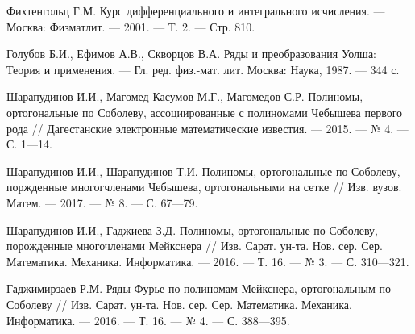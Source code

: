 \begin{thebibliography}{111}
Фихтенгольц Г.М.
Курс дифференциального и интегрального исчисления. --- Москва: Физматлит. --- 2001. --- Т. 2. --- Стр. 810.









Голубов Б.И., Ефимов А.В., Скворцов В.А. Ряды и преобразования Уолша: Теория и применения. --- Гл. ред. физ.-мат. лит. Москва: Наука, 1987. --- 344 с.








Шарапудинов И.И., Магомед-Касумов М.Г., Магомедов С.Р. Полиномы, ортогональные по Соболеву, ассоциированные с полиномами Чебышева первого рода // Дагестанские электронные математические известия. --- 2015. --- № 4. --- С. 1---14.








Шарапудинов И.И., Шарапудинов Т.И. Полиномы, ортогональные по Соболеву, поржденные многогчленами Чебышева, ортогональными на сетке // Изв. вузов. Матем. --- 2017. --- № 8. --- С. 67---79.








Шарапудинов И.И., Гаджиева  З.Д. Полиномы, ортогональные по Соболеву, порожденные многочленами Мейкснера // Изв. Сарат. ун-та. Нов. сер. Сер. Математика. Механика. Информатика. --- 2016. --- Т. 16. --- № 3. --- С. 310---321.








Гаджимирзаев Р.М. Ряды Фурье по полиномам Мейкснера, ортогональным по Соболеву // Изв. Сарат. ун-та. Нов. сер. Сер. Математика. Механика. Информатика. --- 2016. --- Т. 16. --- № 4. --- С. 388---395.






\end{thebibliography} 